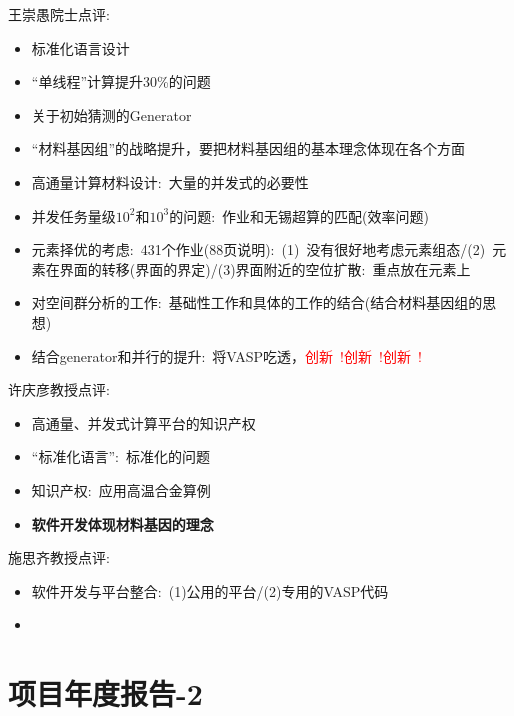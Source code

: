 \documentclass[10pt,a4paper]{article}
\begin{document}
王崇愚院士点评:~
\begin{itemize}
	\item 标准化语言设计
	\item “单线程”计算提升30\%的问题
	\item 关于初始猜测的\textrm{Generator}
	\item “材料基因组”的战略提升，要把材料基因组的基本理念体现在各个方面
	\item 高通量计算材料设计:~大量的并发式的必要性
	\item 并发任务量级$10^2$和$10^3$的问题:~作业和无锡超算的匹配(效率问题)
	\item 元素择优的考虑:~431个作业(88页说明):~(1)~没有很好地考虑元素组态/(2)~元素在界面的转移(界面的界定)/(3)界面附近的空位扩散:~重点放在元素上
	\item 对空间群分析的工作:~基础性工作和具体的工作的结合(结合材料基因组的思想)
	\item 结合\textrm{generator}和并行的提升:~将\textrm{VASP}吃透，\textcolor{red}{创新~!创新~!创新~!}
\end{itemize}
许庆彦教授点评:~
\begin{itemize}
	\item 高通量、并发式计算平台的知识产权
	\item “标准化语言”:~标准化的问题
	\item 知识产权:~应用高温合金算例
	\item \textbf{软件开发体现材料基因的理念}
\end{itemize}
施思齐教授点评:~
\begin{itemize}
	\item 软件开发与平台整合:~(1)公用的平台/(2)专用的\textrm{VASP}代码
	\item
\end{itemize}

\section{项目年度报告-2}
\end{document}

